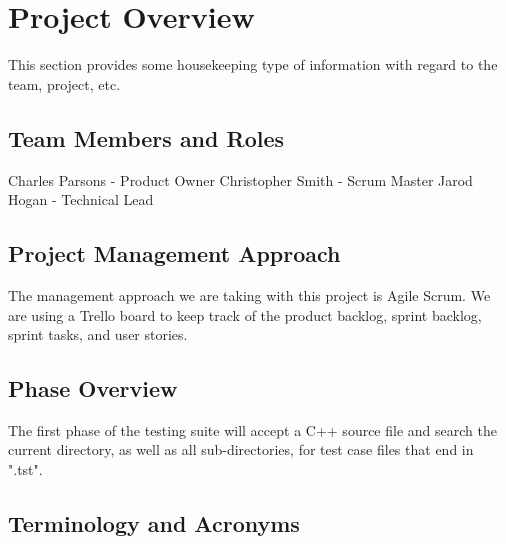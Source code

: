 

\chapter{Project Overview}
This section provides some housekeeping type of information with regard to the 
team, project, etc. 



\section{Team Members and Roles}
Charles Parsons - Product Owner
Christopher Smith - Scrum Master
Jarod Hogan - Technical Lead


\section{Project  Management Approach}
The management approach we are taking with this project is Agile Scrum. We are using a 
Trello board to keep track of the product backlog, sprint backlog, sprint tasks, and user stories.


\section{Phase  Overview}


The first phase of the testing suite will accept a C++ source file and search the current
directory, as well as all sub-directories, for test case files that end in ".tst".

\section{Terminology and Acronyms}
 

